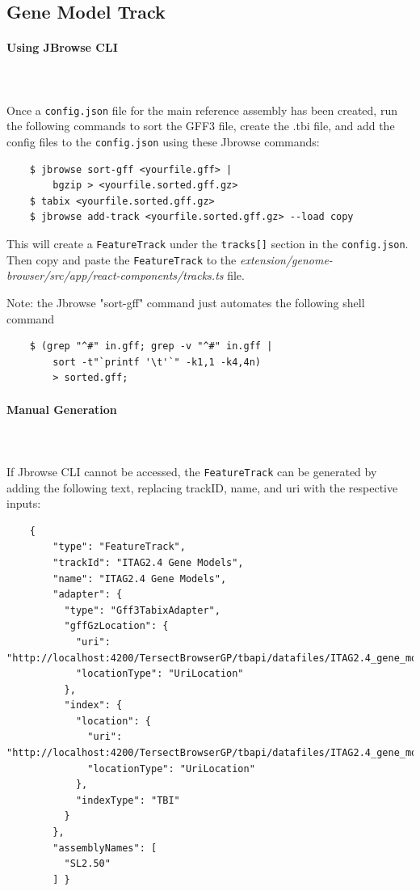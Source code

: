 \documentclass[12pt]{article}
\begin{document}
\subsection{Gene Model Track}
\paragraph{Using JBrowse CLI}\mbox{}
\\\\
Once a \verb+config.json+ file for the main reference assembly has been created, run the following commands to sort the GFF3 file, create the .tbi file, and add the config files to the \verb+config.json+ using these Jbrowse commands:
\lstset{
  language=bash,
  basicstyle=\ttfamily
}
\begin{lstlisting}
    $ jbrowse sort-gff <yourfile.gff> | 
        bgzip > <yourfile.sorted.gff.gz>
    $ tabix <yourfile.sorted.gff.gz>
    $ jbrowse add-track <yourfile.sorted.gff.gz> --load copy
\end{lstlisting}
This will create a \verb+FeatureTrack+ under the \verb+tracks[]+ section in the \verb+config.json+. Then copy and paste the \verb+FeatureTrack+ to the \textit{extension/genome-browser/src/app/react-components/tracks.ts} file.


Note: the Jbrowse "sort-gff" command just automates the following shell command 
\begin{lstlisting}
    $ (grep "^#" in.gff; grep -v "^#" in.gff | 
        sort -t"`printf '\t'`" -k1,1 -k4,4n)  
        > sorted.gff; 
\end{lstlisting}

\paragraph{Manual Generation}\mbox{}
\\\\
If Jbrowse CLI cannot be accessed, the \verb+FeatureTrack+ can be generated by adding the following text, replacing trackID, name, and uri with the respective inputs:
\begin{lstlisting}
    { 
        "type": "FeatureTrack", 
        "trackId": "ITAG2.4 Gene Models", 
        "name": "ITAG2.4 Gene Models", 
        "adapter": { 
          "type": "Gff3TabixAdapter", 
          "gffGzLocation": { 
            "uri": "http://localhost:4200/TersectBrowserGP/tbapi/datafiles/ITAG2.4_gene_models.sorted.gff3.gz", 
            "locationType": "UriLocation" 
          }, 
          "index": { 
            "location": { 
              "uri": "http://localhost:4200/TersectBrowserGP/tbapi/datafiles/ITAG2.4_gene_models.sorted.gff3.gz.tbi", 
              "locationType": "UriLocation" 
            }, 
            "indexType": "TBI" 
          } 
        }, 
        "assemblyNames": [ 
          "SL2.50" 
        ] } 
\end{lstlisting}
\end{document}
